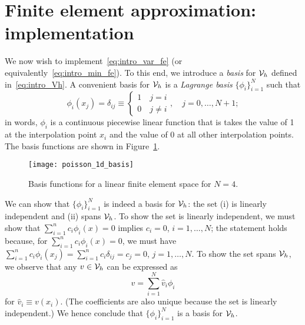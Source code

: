 \section{Finite element approximation: implementation}
We now wish to implement~\eqref{eq:intro_var_fe} (or equivalently~\eqref{eq:intro_min_fe}).  To this end, we introduce a \emph{basis} for $\mathcal{V}_h$ defined in~\eqref{eq:intro_Vh}.  A convenient basis for $\mathcal{V}_h$ is a \emph{Lagrange basis} $\{\phi_i\}_{i=1}^N$ such that 
\begin{equation*}
  \phi_i(x_j) = \delta_{ij} \equiv  \begin{cases}
    1 \quad j = i \\
    0 \quad j\neq i
  \end{cases},
  \quad j = 0,\dots,N+1;
\end{equation*}
in words, $\phi_i$ is a continuous piecewise linear function that is takes the value of 1 at the interpolation point $x_i$ and the value of 0 at all other interpolation points.  The basis functions are shown in Figure~\ref{fig:poisson_1d_basis}.

\begin{figure}
  \centering
  \texttt{[image: poisson\_1d\_basis]}
  \caption{Basis functions for a linear finite element space for $N = 4$.}
  \label{fig:poisson_1d_basis}
\end{figure}

We can show that $\{ \phi_i \}_{i=1}^N$ is indeed a basis for $\mathcal{V}_h$: the set (i) is linearly independent and (ii) spans $\mathcal{V}_h$. To show the set is linearly independent, we must show that $\sum_{i=1}^n c_i \phi_i(x) = 0$ implies $c_i = 0$, $i = 1,\dots,N$; the statement holds because, for $\sum_{i=1}^n c_i \phi_i(x) = 0$, we must have $\sum_{i=1}^n c_i \phi_i(x_j) = \sum_{i=1}^n c_i \delta_{ij} = c_j = 0$, $j = 1,\dots,N$. To show the set spans $\mathcal{V}_h$, we observe that any $v \in \mathcal{V}_h$ can be expressed as
\begin{equation*}
  v = \sum_{i=1}^N \hat v_i \phi_i
\end{equation*}
for $\hat v_i \equiv v(x_i)$. (The coefficients are also unique because the set is linearly independent.)  We hence conclude that $\{\phi_i\}_{i=1}^N$ is a basis for $\mathcal{V}_h$. 


